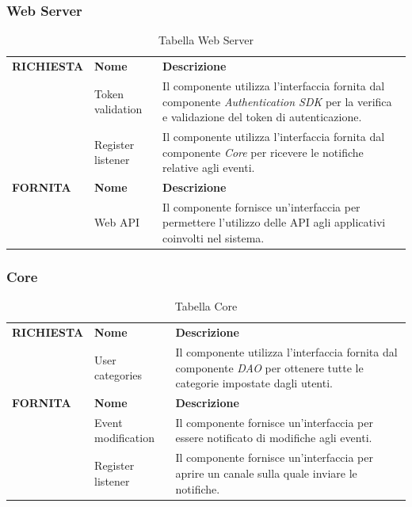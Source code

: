 \documentclass{article}
\begin{document}
\clearpage

\subsubsection{Web Server}

\begin{table}[htbp]
    \centering
    \renewcommand{\arraystretch}{1.3} %
    \begin{tabularx}{\textwidth}{| l | l | X |}
        \Xhline{2pt}
        \textbf{RICHIESTA} & \textbf{Nome} & \textbf{Descrizione} \\
        \Xhline{2pt}
         & Token validation & Il componente utilizza l'interfaccia fornita dal componente \textit{Authentication SDK} per la verifica e validazione del token di autenticazione. \\
        \hline
         & Register listener & Il componente utilizza l'interfaccia fornita dal componente \textit{Core} per ricevere le notifiche relative agli eventi. \\
        \Xhline{2pt}
        \textbf{FORNITA} & \textbf{Nome} & \textbf{Descrizione} \\
        \Xhline{2pt}
         & Web API & Il componente fornisce un'interfaccia per permettere l'utilizzo delle API agli applicativi coinvolti nel sistema. \\
        \hline
    \end{tabularx}
    \caption{Tabella Web Server}
\end{table}

\subsubsection{Core}

\begin{table}[htbp]
    \centering
    \renewcommand{\arraystretch}{1.3} %
    \begin{tabularx}{\textwidth}{| l | l | X |}
        \Xhline{2pt}
        \textbf{RICHIESTA} & \textbf{Nome} & \textbf{Descrizione} \\
        \Xhline{2pt}
         & User categories & Il componente utilizza l'interfaccia fornita dal componente \textit{DAO} per ottenere tutte le categorie impostate dagli utenti. \\
        \Xhline{2pt}
        \textbf{FORNITA} & \textbf{Nome} & \textbf{Descrizione} \\
        \Xhline{2pt}
         & Event modification & Il componente fornisce un'interfaccia per essere notificato di modifiche agli eventi. \\
        \hline
         & Register listener & Il componente fornisce un'interfaccia per aprire un canale sulla quale inviare le notifiche. \\
        \hline
    \end{tabularx}
    \caption{Tabella Core}
\end{table}
\end{document}
